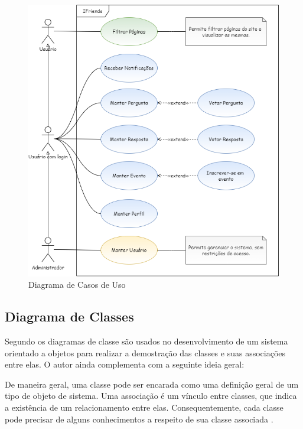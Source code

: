 \begin{figure}[htb]
\centering
\caption{Diagrama de Casos de Uso}
\label{diagrama_CasosUso}
\includegraphics[width=1.0\textwidth]{anexos/Imagens_Diagramas/CasosDeUso_IFriends.png}
\end{figure}
\FloatBarrier

\subsection{Diagrama de Classes}
Segundo  os diagramas de classe são usados no desenvolvimento de um sistema orientado a objetos para realizar a demostração das classes e suas associações entre elas. O autor ainda complementa com a seguinte ideia geral: 

\begin{citacao}
De maneira geral, uma classe pode ser encarada como uma definição geral de um tipo de objeto de sistema. Uma associação é um vínculo entre classes, que indica a existência de um relacionamento entre elas. Consequentemente, cada classe pode precisar de alguns conhecimentos a respeito de sua classe associada \cite{SOMMERVILLE:2019}. 
\end{citacao}

